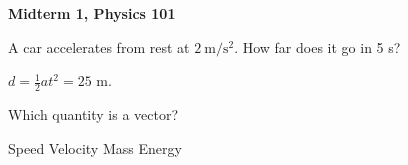 \documentclass[addpoints]{exam}
\begin{document}
\begin{center}\textbf{Midterm 1, Physics 101}\end{center}
\begin{questions}
\question[4] A car accelerates from rest at $2\ \mathrm{m/s^2}$. How far does it go in 5 s?
\begin{solution}
$d = \tfrac12 a t^2 = 25$ m.
\end{solution}
\question Which quantity is a vector?
\begin{choices}
\choice Speed
\CorrectChoice Velocity
\choice Mass
\choice Energy
\end{choices}
\question
{}
\end{questions}
\end{document}
